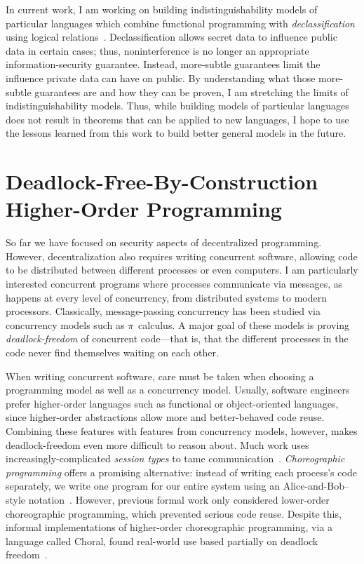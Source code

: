 \documentclass{article}
\theoremstyle{definition}
\begin{document}
In current work, I am working on building indistinguishability models of particular languages which combine functional programming with \emph{declassification} using logical relations~\citep{MenzHLG22}.
Declassification allows secret data to influence public data in certain cases; thus, noninterference is no longer an appropriate information-security guarantee.
Instead, more-subtle guarantees limit the influence private data can have on public.
By understanding what those more-subtle guarantees are and how they can be proven, I am stretching the limits of indistinguishability models.
Thus, while building models of particular languages does not result in theorems that can be applied to new languages, I hope to use the lessons learned from this work to build better general models in the future.

\section*{Deadlock-Free-By-Construction Higher-Order Programming}

So far we have focused on security aspects of decentralized programming.
However, decentralization also requires writing concurrent software, allowing code to be distributed between different processes or even computers.
I am particularly interested concurrent programs where processes communicate via messages, as happens at every level of concurrency, from distributed systems to modern processors.
Classically, message-passing concurrency has been studied via concurrency models such as $\pi$~calculus.
A major goal of these models is proving \emph{deadlock-freedom} of concurrent code---that is, that the different processes in the code never find themselves waiting on each other.

When writing concurrent software, care must be taken when choosing a programming model as well as a concurrency model.
Usually, software engineers prefer higher-order languages such as functional or object-oriented languages, since higher-order abstractions allow more and better-behaved code reuse.
Combining these features with features from concurrency models, however, makes deadlock-freedom even more difficult to reason about.
Much work uses increasingly-complicated \emph{session types} to tame communication~\citep{ScalasY19,HondaYC16}.
\emph{Choreographic programming} offers a promising alternative: instead of writing each process's code separately, we write one program for our entire system using an Alice-and-Bob--style notation~\citep{Montesi13}.
However, previous formal work only considered lower-order choreographic programming, which prevented serious code reuse.
Despite this, informal implementations of higher-order choreographic programming, via a language called Choral, found real-world use based partially on deadlock freedom~\citep{GiallorenzoMP20}.
\end{document}
